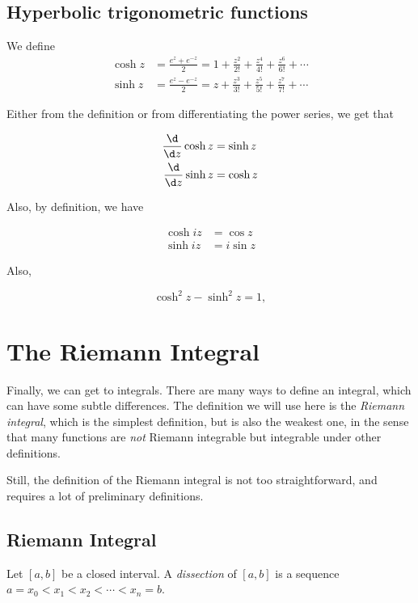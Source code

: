 \documentclass[a4paper]{article}
\begin{document}
\subsection{Hyperbolic trigonometric functions}
\begin{defi}
  We define
  \begin{align*}
    \cosh z &= \frac{e^z + e^{-z}}{2} = 1 + \frac{z^2}{2!} + \frac{z^4}{4!} + \frac{z^6}{6!} + \cdots\\
    \sinh z &= \frac{e^z - e^{-z}}{2} = z + \frac{z^3}{3!} + \frac{z^5}{5!} + \frac{z^7}{7!} + \cdots
  \end{align*}
\end{defi}

Either from the definition or from differentiating the power series, we get that
\begin{prop}
  \begin{align*}
    \frac{\d}{\d z}\cosh z &= \sinh z\\
    \frac{\d }{\d z}\sinh z &= \cosh z
  \end{align*}
\end{prop}
Also, by definition, we have
\begin{prop}
  \begin{align*}
    \cosh iz &= \cos z\\
    \sinh iz &= i\sin z
  \end{align*}
\end{prop}
Also,
\begin{prop}
  \[
    \cosh^2 z - \sinh^2 z = 1,
  \]
\end{prop}
\section{The Riemann Integral}
Finally, we can get to integrals. There are many ways to define an integral, which can have some subtle differences. The definition we will use here is the \emph{Riemann integral}, which is the simplest definition, but is also the weakest one, in the sense that many functions are \emph{not} Riemann integrable but integrable under other definitions.

Still, the definition of the Riemann integral is not too straightforward, and requires a lot of preliminary definitions.
\subsection{Riemann Integral}
\begin{defi}[Dissections]
  Let $[a, b]$ be a closed interval. A \emph{dissection} of $[a, b]$ is a sequence $a = x_0 < x_1 < x_2 < \cdots < x_n = b$.
\end{defi}
\end{document}
